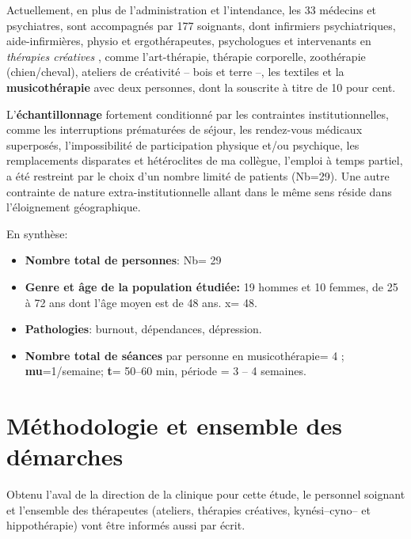 Actuellement, en plus de l'administration et l'intendance, les 33
médecins et psychiatres, sont
accompagnés par 177
soignants, dont infirmiers psychiatriques, aide-infirmières, physio et
ergothérapeutes, 
psychologues et intervenants en \textit{thérapies
créatives }, comme l'art-thérapie, thérapie
corporelle, zoothérapie (chien/cheval),  ateliers de créativité --
bois et terre --,  les textiles et la\textbf{ musicothérapie} avec deux
personnes, dont la souscrite à titre de 10 pour cent.










L'\textbf{échantillonnage} fortement conditionné par les contraintes
institutionnelles, comme les interruptions prématurées de séjour, les rendez-vous
 médicaux superposés, l'impossibilité de participation physique et/ou
 psychique, les remplacements disparates et hétéroclites de ma
 collègue, l'emploi à
 temps partiel, a été restreint  par le choix d'un nombre limité de
 patients (Nb=29).
Une autre contrainte de nature extra-institutionnelle allant dans le
même sens réside dans l'éloignement géographique.

En synthèse:
 \begin{itemize}
 
 \item \textbf{Nombre total de personnes}: Nb= 29 
\item\textbf{Genre et âge de la population étudiée:}  19 hommes et 10 femmes, de 25 à 72
  ans dont l'âge moyen est de 48 ans. x= 48.
 \item\textbf{Pathologies}: burnout, dépendances, dépression.
 \item \textbf{Nombre total de séances} par personne en
   musicothérapie= 4 ;   \textbf{mu}=1/semaine;  
 \textbf{t}= 50--60 min, période = 3 -- 4 semaines.
\end{itemize}




\section{Méthodologie et  ensemble des démarches}
Obtenu l'aval de la direction de la
clinique pour cette étude,  le personnel soignant et l'ensemble des
thérapeutes (ateliers, thérapies créatives, kynési--cyno--
et hippothérapie) vont être informés aussi par écrit.

